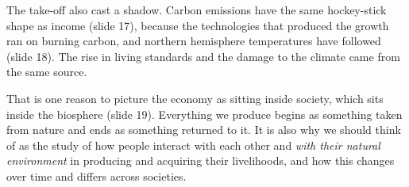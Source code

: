 \documentclass[11pt]{article}
\begin{document}
The take-off also cast a shadow. Carbon emissions have the same hockey-stick shape as income (slide 17), because the technologies that produced the growth ran on burning carbon, and northern hemisphere temperatures have followed (slide 18). The rise in living standards and the damage to the climate came from the same source.

That is one reason to picture the economy as sitting inside society, which sits inside the biosphere (slide 19). Everything we produce begins as something taken from nature and ends as something returned to it. It is also why we should think of  as the study of how people interact with each other and \emph{with their natural environment} in producing and acquiring their livelihoods, and how this changes over time and differs across societies.
\end{document}
